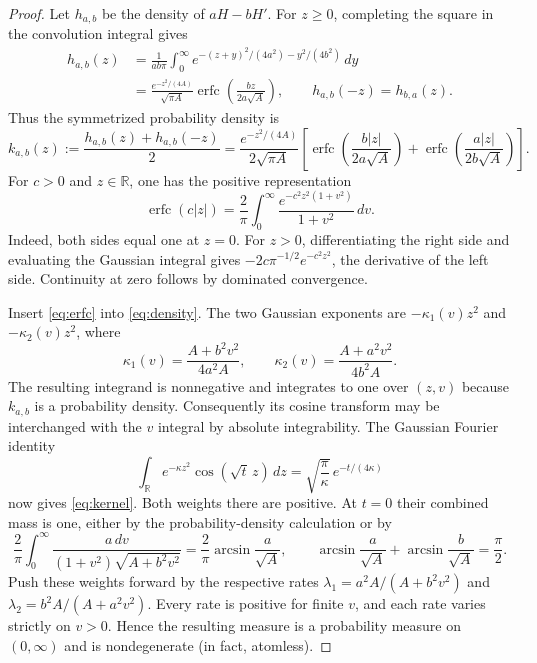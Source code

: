 \documentclass[11pt]{article}
\newcommand{\R}{\mathbb R}
\DeclareMathOperator{\erfc}{erfc}
\begin{document}
\begin{proof}
Let $h_{a,b}$ be the density of $aH-bH'$. For $z\geq0$, completing the
square in the convolution integral gives
\begin{align*}
 h_{a,b}(z)
 &=\frac1{ab\pi}\int_0^\infty
    e^{-(z+y)^2/(4a^2)-y^2/(4b^2)}\,dy\\
 &=\frac{e^{-z^2/(4A)}}{\sqrt{\pi A}}
   \erfc\left(\frac{bz}{2a\sqrt A}\right),
 \qquad h_{a,b}(-z)=h_{b,a}(z).
\end{align*}
Thus the symmetrized probability density is
\begin{equation}\label{eq:density}
 k_{a,b}(z):=\frac{h_{a,b}(z)+h_{a,b}(-z)}2
 =\frac{e^{-z^2/(4A)}}{2\sqrt{\pi A}}
 \left[\erfc\left(\frac{b|z|}{2a\sqrt A}\right)
       +\erfc\left(\frac{a|z|}{2b\sqrt A}\right)\right].
\end{equation}
For $c>0$ and $z\in\R$, one has the positive representation
\begin{equation}\label{eq:erfc}
 \erfc(c|z|)=\frac2\pi\int_0^\infty
          \frac{e^{-c^2z^2(1+v^2)}}{1+v^2}\,dv.
\end{equation}
Indeed, both sides equal one at $z=0$. For $z>0$, differentiating the
right side and evaluating the Gaussian integral gives
$-2c\pi^{-1/2}e^{-c^2z^2}$, the derivative of the left side.
Continuity at zero follows by dominated convergence.

Insert \eqref{eq:erfc} into \eqref{eq:density}. The two Gaussian exponents
are $-\kappa_1(v)z^2$ and $-\kappa_2(v)z^2$, where
\[
 \kappa_1(v)=\frac{A+b^2v^2}{4a^2A},\qquad
 \kappa_2(v)=\frac{A+a^2v^2}{4b^2A}.
\]
The resulting integrand is nonnegative and integrates to one over
$(z,v)$ because $k_{a,b}$ is a probability density. Consequently its
cosine transform may be interchanged with the $v$ integral by absolute
integrability. The Gaussian Fourier identity
\[
 \int_{\R}e^{-\kappa z^2}\cos(\sqrt t\,z)\,dz
 =\sqrt{\frac\pi\kappa}\,e^{-t/(4\kappa)}
\]
now gives \eqref{eq:kernel}.
Both weights there are positive. At $t=0$ their combined mass is one,
either by the probability-density calculation or by
\[
 \frac2\pi\int_0^\infty
 \frac{a\,dv}{(1+v^2)\sqrt{A+b^2v^2}}
 =\frac2\pi\arcsin\frac a{\sqrt A},
 \qquad
 \arcsin\frac a{\sqrt A}+\arcsin\frac b{\sqrt A}=\frac\pi2.
\]
Push these weights forward by the respective rates
$\lambda_1=a^2A/(A+b^2v^2)$ and
$\lambda_2=b^2A/(A+a^2v^2)$.
Every rate is positive for finite $v$, and each rate varies strictly on
$v>0$. Hence the resulting measure is a probability measure on
$(0,\infty)$ and is nondegenerate (in fact, atomless).
\end{proof}
\end{document}
